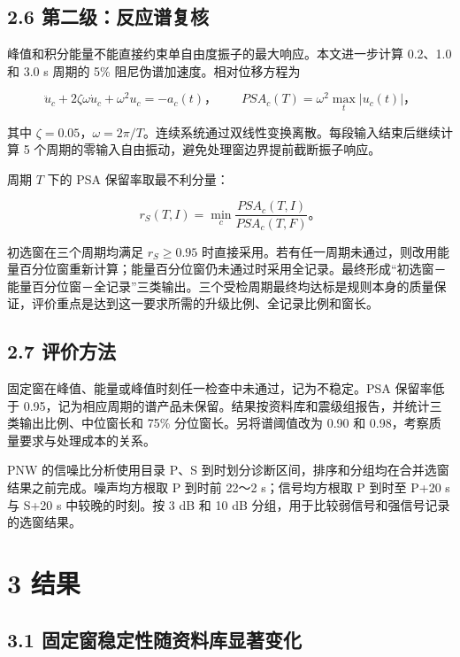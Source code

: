 \documentclass[UTF8,a4paper,zihao=5]{ctexart}
\begin{document}
\subsection*{2.6 第二级：反应谱复核}\label{ux7b2cux4e8cux7ea7ux53cdux5e94ux8c31ux590dux6838}

峰值和积分能量不能直接约束单自由度振子的最大响应。本文进一步计算 0.2、1.0 和 3.0 s 周期的 5\% 阻尼伪谱加速度。相对位移方程为

\[
\ddot u_c+2\zeta\omega\dot u_c+\omega^2u_c=-a_c(t)，
\qquad PSA_c(T)=\omega^2\max_t|u_c(t)|，
\]

其中 \(\zeta=0.05\)，\(\omega=2\pi/T\)。连续系统通过双线性变换离散。每段输入结束后继续计算 5 个周期的零输入自由振动，避免处理窗边界提前截断振子响应。

周期 \(T\) 下的 PSA 保留率取最不利分量：

\[
r_S(T,I)=\min_c\frac{PSA_c(T,I)}{PSA_c(T,F)}。
\]

初选窗在三个周期均满足 \(r_S\geq0.95\) 时直接采用。若有任一周期未通过，则改用能量百分位窗重新计算；能量百分位窗仍未通过时采用全记录。最终形成``初选窗－能量百分位窗－全记录''三类输出。三个受检周期最终均达标是规则本身的质量保证，评价重点是达到这一要求所需的升级比例、全记录比例和窗长。

\subsection*{2.7 评价方法}\label{ux8bc4ux4ef7ux65b9ux6cd5}

固定窗在峰值、能量或峰值时刻任一检查中未通过，记为不稳定。PSA 保留率低于 0.95，记为相应周期的谱产品未保留。结果按资料库和震级组报告，并统计三类输出比例、中位窗长和 75\% 分位窗长。另将谱阈值改为 0.90 和 0.98，考察质量要求与处理成本的关系。

PNW 的信噪比分析使用目录 P、S 到时划分诊断区间，排序和分组均在合并选窗结果之前完成。噪声均方根取 P 到时前 22～2 s；信号均方根取 P 到时至 P+20 s 与 S+20 s 中较晚的时刻。按 3 dB 和 10 dB 分组，用于比较弱信号和强信号记录的选窗结果。

\section*{3 结果}\label{ux7ed3ux679c}

\subsection*{3.1 固定窗稳定性随资料库显著变化}\label{ux56faux5b9aux7a97ux7a33ux5b9aux6027ux968fux8d44ux6599ux5e93ux663eux8457ux53d8ux5316}
\end{document}
